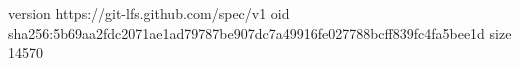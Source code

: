 version https://git-lfs.github.com/spec/v1
oid sha256:5b69aa2fdc2071ae1ad79787be907dc7a49916fe027788bcff839fc4fa5bee1d
size 14570
